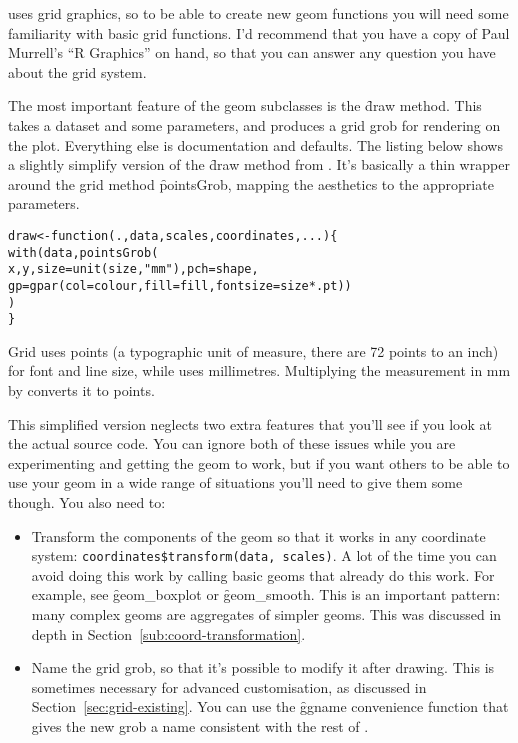 \ggplot uses grid graphics, so to be able to create new geom functions you will need some familiarity with basic grid functions.  I'd recommend that you have a copy of Paul Murrell's ``R Graphics'' on hand, so that you can answer any question you have about the grid system.

The most important feature of the geom subclasses is the \f{draw} method.  This takes a dataset and some parameters, and produces a grid grob for rendering on the plot.  Everything else is documentation and defaults.  The listing below shows a slightly simplify version of the \f{draw} method from .  It's basically a thin wrapper around the grid method \f{pointsGrob}, mapping the aesthetics to the appropriate parameters.

% 
\begin{alltt}
draw <- function(., data, scales, coordinates, ...) \verb|{|    
  with(data, pointsGrob(
      x, y, size = unit(size, "mm"), pch = shape, 
      gp = gpar(col = colour, fill = fill, fontsize = size * .pt))
  )
\verb|}|\end{alltt}


Grid uses points (a typographic unit of measure, there are 72 points to an inch) for font and line size, while \ggplot uses millimetres.  Multiplying the   measurement in mm by  converts it to points.  

This simplified version neglects two extra features that you'll see if you look at the actual source code.  You can ignore both of these issues while you are experimenting and getting the geom to work, but if you want others to be able to use your geom in a wide range of situations you'll need to give them some though.  You also need to:

\begin{itemize}
  \item Transform the components of the geom so that it works in any coordinate system: \verb|coordinates$transform(data, scales)|.  A lot of the time you can avoid doing this work by calling basic geoms that already do this work.  For example, see \f{geom_boxplot} or \f{geom_smooth}.  This is an important pattern: many complex geoms are aggregates of simpler geoms.  This was discussed in depth in Section~\ref{sub:coord-transformation}.

  \item Name the grid grob, so that it's possible to modify it after drawing.  This is sometimes necessary for advanced customisation, as discussed in Section~\ref{sec:grid-existing}.  You can use the \f{ggname} convenience function that gives the new grob a name consistent with the rest of \ggplot.
\end{itemize}

